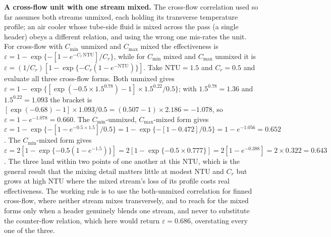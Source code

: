 \textbf{A cross-flow unit with one stream mixed.} The cross-flow correlation used so
far assumes both streams unmixed, each holding its transverse temperature profile; an
air cooler whose tube-side fluid is mixed across the pass (a single header) obeys a
different relation, and using the wrong one mis-rates the unit. For cross-flow with
$C_{\min}$ unmixed and $C_{\max}$ mixed the effectiveness is $\varepsilon = 1 -
\exp\{-[1 - e^{-C_r\,\text{NTU}}]/C_r\}$, while for $C_{\min}$ mixed and $C_{\max}$
unmixed it is $\varepsilon = (1/C_r)[1 - \exp\{-C_r(1 - e^{-\text{NTU}})\}]$. Take
$\text{NTU} = 1.5$ and $C_r = 0.5$ and evaluate all three cross-flow forms. Both
unmixed gives $\varepsilon = 1 - \exp\{[\exp(-0.5\times 1.5^{0.78}) - 1]\times
1.5^{0.22}/0.5\}$; with $1.5^{0.78} = 1.36$ and $1.5^{0.22} = 1.093$ the bracket is
$[\exp(-0.68) - 1]\times 1.093/0.5 = (0.507 - 1)\times 2.186 = -1.078$, so
$\varepsilon = 1 - e^{-1.078} = 0.660$. The $C_{\min}$-unmixed, $C_{\max}$-mixed form
gives $\varepsilon = 1 - \exp\{-[1 - e^{-0.5\times 1.5}]/0.5\} = 1 - \exp\{-[1 -
0.472]/0.5\} = 1 - e^{-1.056} = 0.652$. The $C_{\min}$-mixed form gives
$\varepsilon = 2[1 - \exp\{-0.5(1 - e^{-1.5})\}] = 2[1 - \exp\{-0.5\times 0.777\}] =
2[1 - e^{-0.388}] = 2\times 0.322 = 0.643$. The three land within two points of one
another at this NTU, which is the general result that the mixing detail matters little
at modest NTU and $C_r$ but grows at high NTU where the mixed stream's loss of its
profile costs real effectiveness. The working rule is to use the both-unmixed
correlation for finned cross-flow, where neither stream mixes transversely, and to
reach for the mixed forms only when a header genuinely blends one stream, and never to
substitute the counter-flow relation, which here would return $\varepsilon = 0.686$,
overstating every one of the three.


